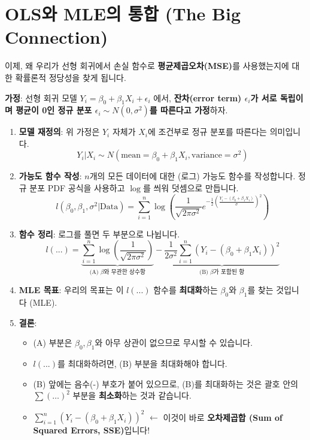 \documentclass[11pt,a4paper]{book}
\theoremstyle{definition}
\begin{document}
\section{OLS와 MLE의 통합 (The Big Connection)}
\label{sec:ols_mle_connection}

이제, 왜 우리가 선형 회귀에서 손실 함수로 \textbf{평균제곱오차(MSE)}를 사용했는지에 대한 확률론적 정당성을 찾게 됩니다.

\begin{tcolorbox}[colback=yellow!5!white, colframe=red!75!black, title={핵심 결론: OLS는 MLE의 특별한 경우이다}]
\textbf{가정}: 선형 회귀 모델 $Y_i = \beta_0 + \beta_1 X_i + \epsilon_i$ 에서, \textbf{잔차(error term) $\epsilon_i$가 서로 독립이며 평균이 0인 정규 분포 $\epsilon_i \sim N(0, \sigma^2)$를 따른다고 가정}하자.

\begin{enumerate}
    \item \textbf{모델 재정의}:
        위 가정은 $Y_i$ 자체가 $X_i$에 조건부로 정규 분포를 따른다는 의미입니다.
        $$Y_i | X_i \sim N(\text{mean}=\beta_0 + \beta_1 X_i, \text{variance}=\sigma^2)$$
    
    \item \textbf{가능도 함수 작성}:
        $n$개의 모든 데이터에 대한 (로그) 가능도 함수를 작성합니다. 정규 분포 PDF 공식을 사용하고 $\log$를 씌워 덧셈으로 만듭니다.
        $$l(\beta_0, \beta_1, \sigma^2 | \text{Data}) = \sum_{i=1}^{n} \log \left( \frac{1}{\sqrt{2\pi\sigma^2}} e^{-\frac{1}{2} \left(\frac{Y_i - (\beta_0 + \beta_1 X_i)}{\sigma}\right)^2} \right)$$

    \item \textbf{함수 정리}:
        로그를 풀면 두 부분으로 나뉩니다.
        $$l(...) = \underbrace{ \sum_{i=1}^{n} \log\left(\frac{1}{\sqrt{2\pi\sigma^2}}\right) }_{\text{(A) $\beta$와 무관한 상수항}} - \underbrace{ \frac{1}{2\sigma^2} \sum_{i=1}^{n} \left( Y_i - (\beta_0 + \beta_1 X_i) \right)^2 }_{\text{(B) $\beta$가 포함된 항}} $$
    
    \item \textbf{MLE 목표}:
        우리의 목표는 이 $l(...)$ 함수를 \textbf{최대화}하는 $\beta_0$와 $\beta_1$를 찾는 것입니다 (MLE).
        
    \item \textbf{결론}:
        \begin{itemize}
            \item (A) 부분은 $\beta_0, \beta_1$와 아무 상관이 없으므로 무시할 수 있습니다.
            \item $l(...)$를 최대화하려면, (B) 부분을 최대화해야 합니다.
            \item (B) 앞에는 음수(-) 부호가 붙어 있으므로, (B)를 최대화하는 것은 괄호 안의 $\sum (\dots)^2$ 부분을 \textbf{최소화}하는 것과 같습니다.
            \item $\sum_{i=1}^{n} \left( Y_i - (\beta_0 + \beta_1 X_i) \right)^2$ $\leftarrow$ 이것이 바로 \textbf{오차제곱합 (Sum of Squared Errors, SSE)}입니다!
        \end{itemize}
\end{enumerate}


\end{tcolorbox}
\end{document}
